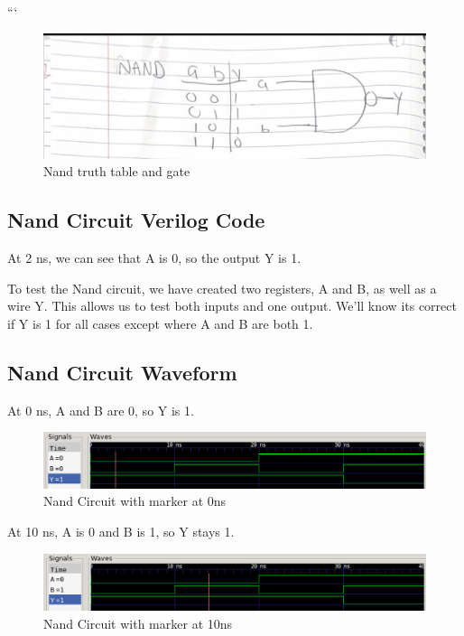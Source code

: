 \documentclass[12pt]{article}
\begin{document}
```\begin{figure}[H]
    \centering
    \includegraphics[width = 1.0\textwidth]{Truth-Tables/NandTT.PNG}
    \caption{Nand truth table and gate}
    \label{fig:shift-table}
\end{figure}

\subsection{Nand Circuit Verilog Code}
At 2 ns, we can see that  A is 0, so the output Y is 1.


To test the Nand circuit, we have created two registers, A and B, as well as a wire Y. This allows us to test both inputs and one output. We'll know its correct if Y is 1 for all cases except where A and B are both 1.

\subsection{Nand Circuit Waveform}

At 0 ns, A and B are 0, so Y is 1.
\begin{figure}[H]
    \centering
    \includegraphics[width = 1.0\textwidth]{nand/nand_wave1.PNG}
    \caption{Nand Circuit with marker at 0ns}
    \label{fig:enter-label}
\end{figure}

At 10 ns, A is 0 and B is 1, so Y stays 1.
\begin{figure}[H]
    \centering
    \includegraphics[width = 1.0\textwidth]{nand/nand_wave2.PNG}
    \caption{Nand Circuit with marker at 10ns}
    \label{fig:enter-label}
\end{figure}
\end{document}
